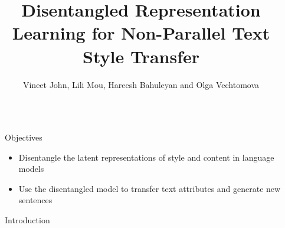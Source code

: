 \documentclass[final]{beamer}
\title{Disentangled Representation Learning for Non-Parallel Text Style Transfer} %
\author{Vineet John, Lili Mou, Hareesh Bahuleyan and Olga Vechtomova} %
\institute{University of Waterloo} %
\newlength{\sepwid}
\newlength{\onecolwid}
\begin{document}
\graphicspath{{images/}}


\setlength{\belowcaptionskip}{2ex} %
\setlength\belowdisplayshortskip{2ex} %

\begin{frame}[t] %

    \begin{columns}[t] %

        \begin{column}{\sepwid}\end{column} %

        \begin{column}{\onecolwid} %


            \begin{alertblock}{Objectives}

                \begin{itemize}
                    \item Disentangle the latent representations of style and content in language models
                    \item Use the disentangled model to transfer text attributes and generate new sentences
                \end{itemize}

            \end{alertblock}


            \begin{block}{Introduction}


\end{block}
\end{column}
\end{columns}
\end{frame}
\end{document}

